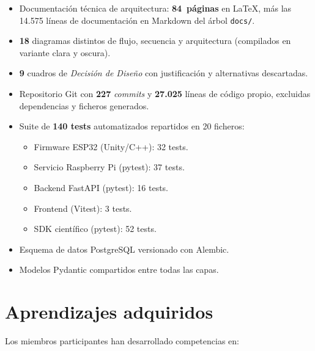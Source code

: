 \begin{itemize}[leftmargin=*]
    \item Documentaci\'on t\'ecnica de arquitectura: \textbf{84~p\'aginas}
    en LaTeX, m\'as las 14.575 l\'ineas de documentaci\'on en Markdown del
    \'arbol \texttt{docs/}.
    \item \textbf{18} diagramas distintos de flujo, secuencia y
    arquitectura (compilados en variante clara y oscura).
    \item \textbf{9} cuadros de \textit{Decisi\'on de Dise\~no} con
    justificaci\'on y alternativas descartadas.
    \item Repositorio Git con \textbf{227} \textit{commits} y
    \textbf{27.025} l\'ineas de c\'odigo propio, excluidas dependencias y
    ficheros generados.
    \item Suite de \textbf{140 tests} automatizados repartidos en 20 ficheros:
    \begin{itemize}
        \item Firmware ESP32 (Unity/C++): 32 tests.
        \item Servicio Raspberry Pi (pytest): 37 tests.
        \item Backend FastAPI (pytest): 16 tests.
        \item Frontend (Vitest): 3 tests.
        \item SDK cient\'ifico (pytest): 52 tests.
    \end{itemize}
    \item Esquema de datos PostgreSQL versionado con Alembic.
    \item Modelos Pydantic compartidos entre todas las capas.
\end{itemize}

\section{Aprendizajes adquiridos}

Los miembros participantes han desarrollado competencias en:

